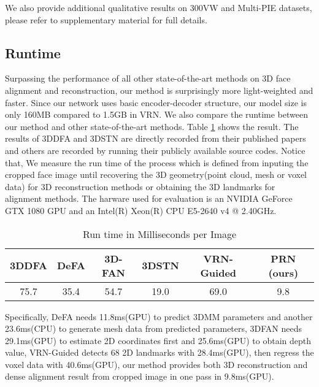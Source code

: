 \documentclass[runningheads]{llncs}
\begin{document}
We also provide additional qualitative results on 300VW\cite{chrysos2015offline} and Multi-PIE\cite{Hartley2003Multiple} datasets, please refer to supplementary material for full details.

\subsection{Runtime}
\label{sec: runtime}

Surpassing the performance of all other state-of-the-art methods on 3D face alignment and reconstruction, our method is surprisingly more light-weighted and faster. 
Since our network uses basic encoder-decoder structure, our model size is only 160MB compared to 1.5GB in VRN\cite{Jackson2017Large}.
We also compare the runtime between our method and other state-of-the-art methods. Table \ref{tab: runtime} shows the result.  
The results of 3DDFA and 3DSTN are directly recorded from their published papers and others are recorded by running their publicly available source codes. 
Notice that, We measure the run time of the process which is defined from inputing the cropped face image until recovering the 3D geometry(point cloud, mesh or voxel data) for 3D reconstruction methods or obtaining the 3D landmarks for alignment methods. The harware used for evaluation is an NVIDIA GeForce GTX 1080 GPU and an Intel(R) Xeon(R) CPU E5-2640 v4 @ 2.40GHz.

\begin{table}
\vspace{-3mm}
\begin{center}
\caption{Run time in Milliseconds per Image}
\label{tab: runtime}
\begin{tabular}{|c|c|c|c|c|c|}
\hline
3DDFA\cite{zhu2016face} &  DeFA\cite{liu2017dense} & 3D-FAN\cite{Bulat2017How} & 
3DSTN\cite{bhagavatula2017faster} & VRN-Guided\cite{Jackson2017Large} & PRN (ours)\\
\hline
75.7 & 35.4 & 54.7 & 
19.0 & 69.0 & 9.8\\
\hline
\end{tabular}
\end{center}
\vspace{-3mm}
\end{table}

Specifically, 
DeFA needs 11.8ms(GPU) to predict 3DMM parameters and another 23.6ms(CPU) to generate mesh data from predicted parameters,
3DFAN needs 29.1ms(GPU) to estimate 2D coordinates first and 25.6ms(GPU) to obtain depth value, 
VRN-Guided detects 68 2D landmarks with 28.4ms(GPU), then regress the voxel data with 40.6ms(GPU), 
our method provides both 3D reconstruction and dense alignment result from cropped image in one pass in 9.8ms(GPU).
\end{document}
